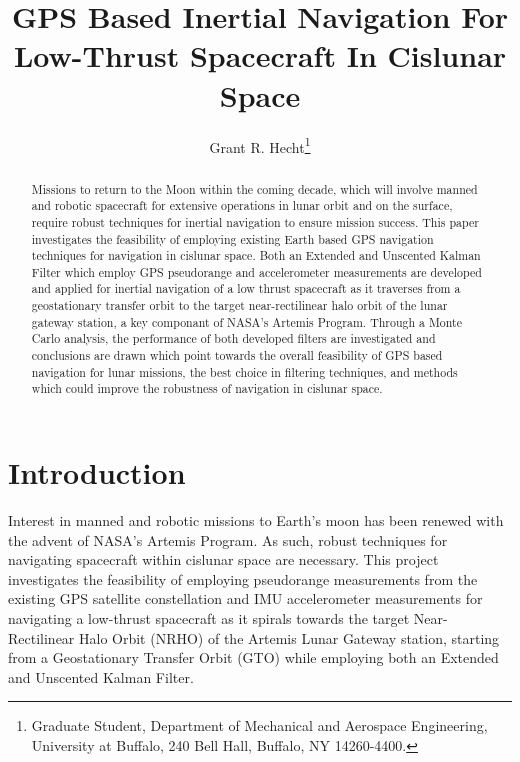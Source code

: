 \documentclass[letterpaper, paper,11pt]{AAS}		%
\begin{document}
\title{GPS Based Inertial Navigation For Low-Thrust Spacecraft In Cislunar Space}

\author{Grant R. Hecht\thanks{Graduate Student, Department of Mechanical and Aerospace Engineering, University at Buffalo, 240 Bell Hall, Buffalo, NY  14260-4400.}}

\maketitle{} 		

\begin{abstract}
	Missions to return to the Moon within the coming decade, which will involve manned and robotic spacecraft for extensive operations in lunar orbit and on the surface, require robust techniques for inertial navigation to ensure mission success. This paper investigates the feasibility of employing existing Earth based GPS navigation techniques for navigation in cislunar space. Both an Extended and Unscented Kalman Filter which employ GPS pseudorange and accelerometer measurements are developed and applied for inertial navigation of a low thrust spacecraft as it traverses from a geostationary transfer orbit to the target near-rectilinear halo orbit of the lunar gateway station, a key componant of NASA's Artemis Program. Through a Monte Carlo analysis, the performance of both developed filters are investigated and conclusions are drawn which point towards the overall feasibility of GPS based navigation for lunar missions, the best choice in filtering techniques, and methods which could improve the robustness of navigation in cislunar space. 
\end{abstract}

\section{Introduction}
Interest in manned and robotic missions to Earth's moon has been renewed with the advent of NASA's Artemis Program. As such, robust techniques for navigating spacecraft within cislunar space are necessary.  This project investigates the feasibility of employing pseudorange measurements from the existing GPS satellite constellation and IMU accelerometer measurements for navigating a low-thrust spacecraft as it spirals towards the target Near-Rectilinear Halo Orbit (NRHO) of the Artemis Lunar Gateway station, starting from a Geostationary Transfer Orbit (GTO) while employing both an Extended and Unscented Kalman Filter.
\end{document}

